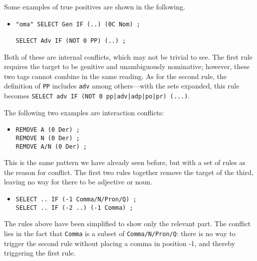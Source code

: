 Some examples of true positives are shown in the following.


\begin{itemize}
\item[]\begin{verbatim}
"oma" SELECT Gen IF (..) (0C Nom) ;

SELECT Adv IF (NOT 0 PP) (..) ;
\end{verbatim}
\end{itemize}

Both of these are internal conflicts, which may not be trivial to see.
The first rule requires the target to be genitive and unambiguously nominative; however, these two tags cannot combine in the same reading.
As for the second rule, the definition of \texttt{PP} includes \texttt{adv} among others---with the sets expanded, this rule becomes \texttt{SELECT adv IF (NOT 0 pp|adv|adp|po|pr) (...)}.

The following two examples are interaction conflicts:

\begin{itemize}
\item[]\begin{verbatim}
REMOVE A (0 Der) ; 
REMOVE N (0 Der) ; 
REMOVE A/N (0 Der) ; 
\end{verbatim}
\end{itemize}

This is the same pattern we have already seen before, but with a set of rules as the reason for conflict.
The first two rules together remove the target of the third, leaving no way for there to be adjective or noun.

\begin{itemize}
\item[]\begin{verbatim}
SELECT .. IF (-1 Comma/N/Pron/Q) ;
SELECT .. IF (-2 ..) (-1 Comma) ;
\end{verbatim}
\end{itemize}

The rules above have been simplified to show only the relevant part.
The conflict lies in the fact that \texttt{Comma} is a subset of \texttt{Comma/N/Pron/Q}:
there is no way to trigger the second rule without placing a comma in position -1, and thereby triggering the first rule.




